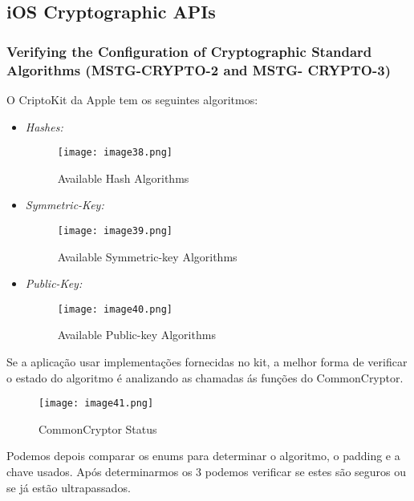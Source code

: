 \subsection{iOS Cryptographic APIs}

\hfill\par

\subsubsection{Verifying the Configuration of Cryptographic Standard Algorithms (MSTG-CRYPTO-2 and MSTG- CRYPTO-3)}
\hfill\par
\hfill\par

O CriptoKit da Apple tem os seguintes algoritmos:
\begin{itemize}
\item \textit{Hashes:}

\begin{figure}[H]
\centering
\texttt{[image: image38.png]}
\caption {Available Hash Algorithms}
\label {fig02}
\end{figure}

\item \textit{Symmetric-Key:}

\begin{figure}[H]
\centering
\texttt{[image: image39.png]}
\caption {Available Symmetric-key Algorithms}
\label {fig02}
\end{figure}
\item \textit{Public-Key:}

\begin{figure}[H]
\centering
\texttt{[image: image40.png]}
\caption {Available Public-key Algorithms}
\label {fig02}
\end{figure}
\end{itemize}

Se a aplicação usar implementações fornecidas no kit, a melhor forma de verificar o estado do algoritmo é analizando as chamadas ás funções do CommonCryptor. 

\begin{figure}[H]
\centering
\texttt{[image: image41.png]}
\caption {CommonCryptor Status}
\label {fig02}
\end{figure}

Podemos depois comparar os enums para determinar o algoritmo, o padding e a chave usados.
Após determinarmos os 3 podemos verificar se estes são seguros ou se já estão ultrapassados.



